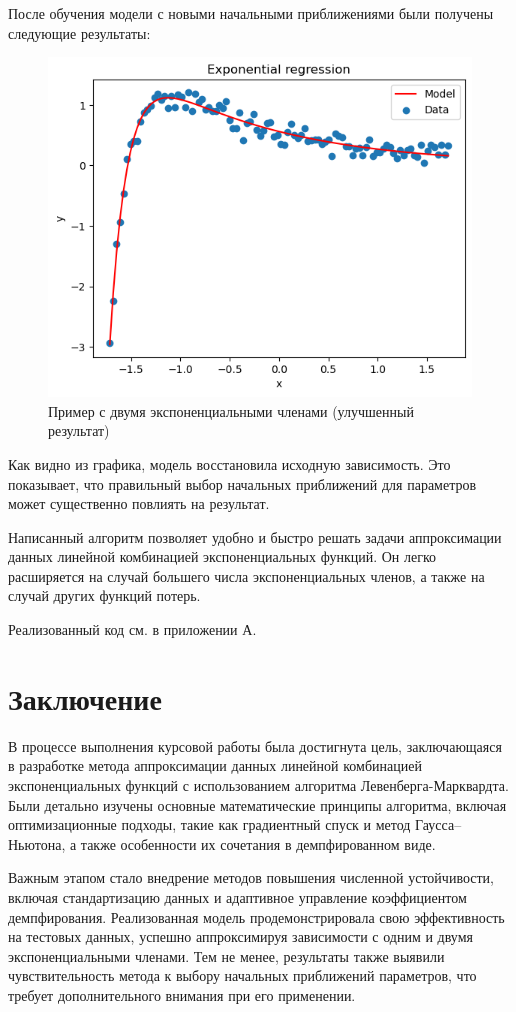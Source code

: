 После обучения модели с новыми начальными приближениями были получены следующие результаты:

\begin{figure}[h!]
	\centering
	\includegraphics[width=0.7\linewidth]{../img/ex2_good.png}
	\caption{Пример с двумя экспоненциальными членами (улучшенный результат)}
\end{figure}


Как видно из графика, модель восстановила исходную зависимость. Это показывает, что правильный выбор начальных приближений для параметров может существенно повлиять на результат.

Написанный алгоритм позволяет удобно и быстро решать задачи аппроксимации данных линейной комбинацией экспоненциальных функций. Он легко расширяется на случай большего числа экспоненциальных членов, а также на случай других функций потерь.

Реализованный код см. в приложении А.

\newpage
\section*{Заключение}

В процессе выполнения курсовой работы была достигнута цель, заключающаяся в разработке метода аппроксимации данных линейной комбинацией экспоненциальных функций с использованием алгоритма Левенберга-Марквардта. Были детально изучены основные математические принципы алгоритма, включая оптимизационные подходы, такие как градиентный спуск и метод Гаусса–Ньютона, а также особенности их сочетания в демпфированном виде.

Важным этапом стало внедрение методов повышения численной устойчивости, включая стандартизацию данных и адаптивное управление коэффициентом демпфирования. Реализованная модель продемонстрировала свою эффективность на тестовых данных, успешно аппроксимируя зависимости с одним и двумя экспоненциальными членами. Тем не менее, результаты также выявили чувствительность метода к выбору начальных приближений параметров, что требует дополнительного внимания при его применении.

